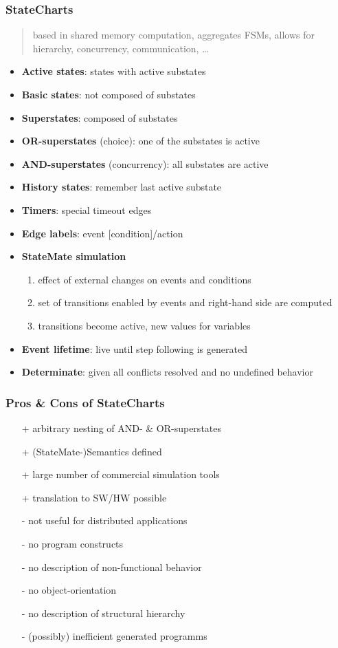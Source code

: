 \documentclass{article}
\begin{document}
\subsubsection{StateCharts}
\begin{quote} based in shared memory computation, aggregates FSMs, allows for hierarchy, concurrency, communication, …\end{quote}

\begin{itemize}
  \item \textbf{Active states}: states with active substates
  \item \textbf{Basic states}: not composed of substates
  \item \textbf{Superstates}: composed of substates
  \item \textbf{OR-superstates} (choice): one of the substates is active
  \item \textbf{AND-superstates} (concurrency): all substates are active
  \item \textbf{History states}: remember last active substate
  \item \textbf{Timers}: special timeout edges
  \item \textbf{Edge labels}: event [condition]/action
  \item \textbf{StateMate simulation}
        \begin{enumerate}
          \item effect of external changes on events and conditions
          \item set of transitions enabled by events and right-hand side are computed
          \item transitions become active, new values for variables
        \end{enumerate}
  \item \textbf{Event lifetime}: live until step following is generated
  \item \textbf{Determinate}: given all conflicts resolved and no undefined behavior
\end{itemize}

\subsubsection{Pros \& Cons of StateCharts}
\begin{itemize}
  \item[+] arbitrary nesting of AND- \& OR-superstates
  \item[+] (StateMate-)Semantics defined
  \item[+] large number of commercial simulation tools
  \item[+] translation to SW/HW possible
  \item[-] not useful for distributed applications
  \item[-] no program constructs
  \item[-] no description of non-functional behavior
  \item[-] no object-orientation
  \item[-] no description of structural hierarchy
  \item[-] (possibly) inefficient generated programms
\end{itemize}
\end{document}
